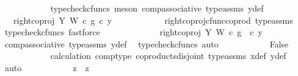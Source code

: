 \begin{isabellebody}
\ \ \ \ \ \ \ \ \ \ \isamarkupfalse%
\ {\isacharparenleft}{\kern0pt}typecheck{\isacharunderscore}{\kern0pt}cfuncs{\isacharcomma}{\kern0pt}\ meson\ comp{\isacharunderscore}{\kern0pt}associative{}\ type{\isacharunderscore}{\kern0pt}assms\ y{}{\isacharunderscore}{\kern0pt}def{\isacharparenright}{\kern0pt}\isanewline
\ \ \ \ \ \ \ \ \isamarkupfalse%
\ \isamarkupfalse%
\ {\isachardoublequoteopen}{\isachardot}{\kern0pt}{\isachardot}{\kern0pt}{\isachardot}{\kern0pt}\ {\isacharequal}{\kern0pt}\ {\isacharparenleft}{\kern0pt}right{\isacharunderscore}{\kern0pt}coproj\ Y\ W\ {\isasymcirc}\isactrlsub c\ g{\isacharparenright}{\kern0pt}\ {\isasymcirc}\isactrlsub c\ y{}{\isachardoublequoteclose}\isanewline
\ \ \ \ \ \ \ \ \ \ \isamarkupfalse%
\ right{\isacharunderscore}{\kern0pt}coproj{\isacharunderscore}{\kern0pt}cfunc{\isacharunderscore}{\kern0pt}coprod\ type{\isacharunderscore}{\kern0pt}assms\ \ \isamarkupfalse%
\ {\isacharparenleft}{\kern0pt}typecheck{\isacharunderscore}{\kern0pt}cfuncs{\isacharcomma}{\kern0pt}\ fastforce{\isacharparenright}{\kern0pt}\isanewline
\ \ \ \ \ \ \ \ \isamarkupfalse%
\ \isamarkupfalse%
\ {\isachardoublequoteopen}{\isachardot}{\kern0pt}{\isachardot}{\kern0pt}{\isachardot}{\kern0pt}\ {\isacharequal}{\kern0pt}\ right{\isacharunderscore}{\kern0pt}coproj\ Y\ W\ {\isasymcirc}\isactrlsub c\ g\ \ {\isasymcirc}\isactrlsub c\ y{}{\isachardoublequoteclose}\isanewline
\ \ \ \ \ \ \ \ \ \ \isamarkupfalse%
\ comp{\isacharunderscore}{\kern0pt}associative{}\ type{\isacharunderscore}{\kern0pt}assms{\isacharparenleft}{\kern0pt}{}{\isacharparenright}{\kern0pt}\ y{}{\isacharunderscore}{\kern0pt}def\ \isamarkupfalse%
\ {\isacharparenleft}{\kern0pt}typecheck{\isacharunderscore}{\kern0pt}cfuncs{\isacharcomma}{\kern0pt}\ auto{\isacharparenright}{\kern0pt}\isanewline
\ \ \ \ \ \ \ \ \isamarkupfalse%
\ \isamarkupfalse%
\ False\isanewline
\ \ \ \ \ \ \ \ \ \ \isamarkupfalse%
\ calculation\ comp{\isacharunderscore}{\kern0pt}type\ coproducts{\isacharunderscore}{\kern0pt}disjoint\ type{\isacharunderscore}{\kern0pt}assms\ x{}{\isacharunderscore}{\kern0pt}def\ y{}{\isacharunderscore}{\kern0pt}def\ \isamarkupfalse%
\ auto\isanewline
\ \ \ \ \ \ \ \ \isamarkupfalse%
\ \isamarkupfalse%
\ {\isachardoublequoteopen}z{}\ {\isacharequal}{\kern0pt}\ z{}{\isachardoublequoteclose}\isanewline

\end{isabellebody}

